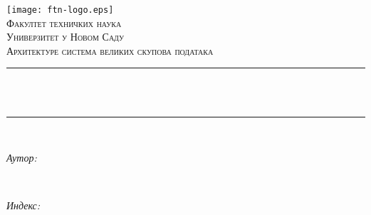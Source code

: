 \begin{titlepage}
	\centering
    \vspace*{0.5 cm}
    \texttt{[image: ftn-logo.eps]}\\[1.0 cm]	                %
    \textsc{\LARGE Факултет техничких наука}\\[0.5 cm]	                    %
	\textsc{\Large Универзитет у Новом Саду}\\[1.0 cm]				        %
	\textsc{\large Архитектуре система великих скупова података}\\[0.5 cm]		%
	\rule{\linewidth}{0.2 mm} \\[0.4 cm]
	{ \huge \bfseries \thetitle}\\
	\rule{\linewidth}{0.2 mm} \\[1.5 cm]
	
	\begin{minipage}{0.4\textwidth}
		\begin{flushleft} \large
			\emph{Аутор:}\\
			\theauthor
			\end{flushleft}
			\end{minipage}~
			\begin{minipage}{0.4\textwidth}
			\begin{flushright} \large
			\emph{Индекс:} \\
			\theindex								                        %
		\end{flushright}
	\end{minipage}\\[2.0 cm]
	
	{\large \thedate}\\[2 cm]
	\vfill
\end{titlepage}